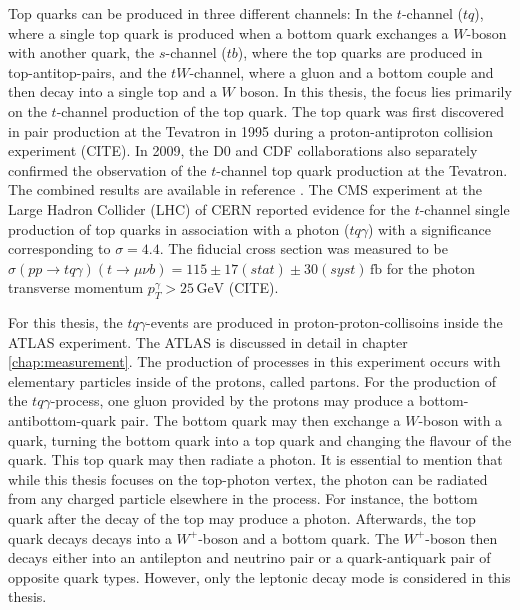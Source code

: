 Top quarks can be produced in three different channels: In the $t$-channel ($tq$), where a single top quark is produced when a bottom quark exchanges a $W$-boson with another quark, the $s$-channel ($tb$), where the top quarks are produced in top-antitop-pairs, and the $tW$-channel, where a gluon and a bottom couple and then decay into a single top and a $W$ boson. In this thesis, the focus lies primarily on the $t$-channel production of the top quark. 
The top quark was first discovered in pair production at the Tevatron in 1995 during a proton-antiproton collision experiment (CITE). In 2009, the D0 \cite{singletop1} and CDF \cite{singletop2} collaborations also separately confirmed the observation of the $t$-channel top quark production at the Tevatron. The combined results are available in reference \cite{singletop3}. 
The CMS experiment at the Large Hadron Collider (LHC) of CERN \cite{CMS} reported evidence for the $t$-channel single production of top quarks in association with a photon ($tq\gamma$) with a significance corresponding to $\sigma = 4.4$. The fiducial cross section 
was measured to be $\sigma(pp\rightarrow tq\gamma)(t\rightarrow\mu \nu b) = 115 \pm 17 (stat) \pm 30 (syst) \,\si{\femto\barn}$ for the photon transverse momentum $p_T^\gamma > 25 \,\si{\giga\electronvolt}$ (CITE). 

For this thesis, the $tq\gamma$-events are produced in proton-proton-collisoins inside the ATLAS experiment. The ATLAS is discussed in detail in chapter \ref{chap:measurement}. The production of processes in this experiment occurs with elementary particles inside of the protons, called partons. For the production of the $tq\gamma$-process, one gluon provided by the protons may produce a bottom-antibottom-quark pair. The bottom quark may then exchange a $W$-boson with a quark, turning the bottom quark into a top quark and changing the flavour of the quark. This top quark may then radiate a photon. 
It is essential to mention that while this thesis focuses on the top-photon vertex, the photon can be radiated from any charged particle elsewhere in the process. For instance, the bottom quark after the decay of the top may produce a photon.
Afterwards, the top quark decays decays into a $W^+$-boson and a bottom quark. The $W^+$-boson then decays either into an antilepton and neutrino pair or a quark-antiquark pair of opposite quark types. However, only the leptonic decay mode is considered in this thesis.

